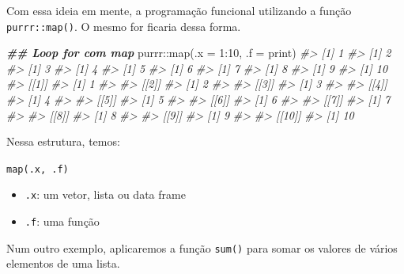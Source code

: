 \documentclass[
]{book}
\newenvironment{Shaded}{\begin{snugshade}}{\end{snugshade}}
\newcommand{\AttributeTok}[1]{\textcolor[rgb]{0.61,0.61,0.61}{#1}}
\newcommand{\CommentTok}[1]{\textcolor[rgb]{0.37,0.37,0.37}{\textit{#1}}}
\newcommand{\DecValTok}[1]{\textcolor[rgb]{0.06,0.06,0.06}{#1}}
\newcommand{\DocumentationTok}[1]{\textcolor[rgb]{0.37,0.37,0.37}{\textbf{\textit{#1}}}}
\newcommand{\FunctionTok}[1]{\textcolor[rgb]{0,0,0}{#1}}
\newcommand{\NormalTok}[1]{#1}
\newcommand{\SpecialCharTok}[1]{\textcolor[rgb]{0,0,0}{#1}}
\providecommand{\tightlist}{%
  \setlength{\itemsep}{0pt}\setlength{\parskip}{0pt}}
\begin{document}
Com essa ideia em mente, a programação funcional utilizando a função \texttt{purrr::map()}. O mesmo for ficaria dessa forma.

\begin{Shaded}
\begin{Highlighting}[]
\DocumentationTok{\#\# Loop for com map}
\NormalTok{purrr}\SpecialCharTok{::}\FunctionTok{map}\NormalTok{(}\AttributeTok{.x =} \DecValTok{1}\SpecialCharTok{:}\DecValTok{10}\NormalTok{, }\AttributeTok{.f =}\NormalTok{ print)}
\CommentTok{\#\textgreater{} [1] 1}
\CommentTok{\#\textgreater{} [1] 2}
\CommentTok{\#\textgreater{} [1] 3}
\CommentTok{\#\textgreater{} [1] 4}
\CommentTok{\#\textgreater{} [1] 5}
\CommentTok{\#\textgreater{} [1] 6}
\CommentTok{\#\textgreater{} [1] 7}
\CommentTok{\#\textgreater{} [1] 8}
\CommentTok{\#\textgreater{} [1] 9}
\CommentTok{\#\textgreater{} [1] 10}
\CommentTok{\#\textgreater{} [[1]]}
\CommentTok{\#\textgreater{} [1] 1}
\CommentTok{\#\textgreater{} }
\CommentTok{\#\textgreater{} [[2]]}
\CommentTok{\#\textgreater{} [1] 2}
\CommentTok{\#\textgreater{} }
\CommentTok{\#\textgreater{} [[3]]}
\CommentTok{\#\textgreater{} [1] 3}
\CommentTok{\#\textgreater{} }
\CommentTok{\#\textgreater{} [[4]]}
\CommentTok{\#\textgreater{} [1] 4}
\CommentTok{\#\textgreater{} }
\CommentTok{\#\textgreater{} [[5]]}
\CommentTok{\#\textgreater{} [1] 5}
\CommentTok{\#\textgreater{} }
\CommentTok{\#\textgreater{} [[6]]}
\CommentTok{\#\textgreater{} [1] 6}
\CommentTok{\#\textgreater{} }
\CommentTok{\#\textgreater{} [[7]]}
\CommentTok{\#\textgreater{} [1] 7}
\CommentTok{\#\textgreater{} }
\CommentTok{\#\textgreater{} [[8]]}
\CommentTok{\#\textgreater{} [1] 8}
\CommentTok{\#\textgreater{} }
\CommentTok{\#\textgreater{} [[9]]}
\CommentTok{\#\textgreater{} [1] 9}
\CommentTok{\#\textgreater{} }
\CommentTok{\#\textgreater{} [[10]]}
\CommentTok{\#\textgreater{} [1] 10}
\end{Highlighting}
\end{Shaded}

Nessa estrutura, temos:

\texttt{map(.x,\ .f)}

\begin{itemize}
\tightlist
\item
  \texttt{.x}: um vetor, lista ou data frame\\
\item
  \texttt{.f}: uma função
\end{itemize}

Num outro exemplo, aplicaremos a função \texttt{sum()} para somar os valores de vários elementos de uma lista.
\end{document}
